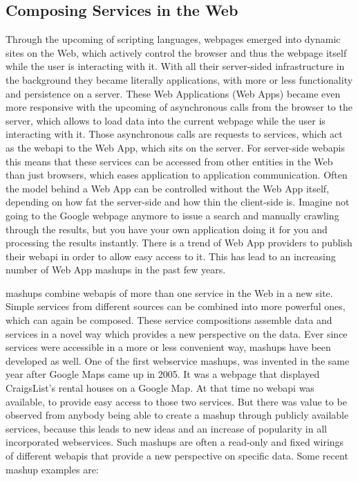 \subsection{Composing Services in the Web}
Through the upcoming of scripting languages, webpages emerged into dynamic sites on the Web, which actively control the browser and thus the webpage itself while the user is interacting with it.
With all their server-sided infrastructure in the background they became literally applications, with more or less functionality and persistence on a server.
These \textrm{Web Applications (Web Apps)} became even more responsive with the upcoming of asynchronous calls from the browser to the server, which allows to load data into the current webpage while the user is interacting with it.
Those asynchronous calls are requests to services, which act as the \textrm{\gls{webapi}} to the \textrm{Web App}, which sits on the server.
For server-side \textrm{\gls{webapi}s} this means that these services can be accessed from other entities in the Web than just browsers, which eases application to application communication.
Often the model behind a \textrm{Web App} can be controlled without the \textrm{Web App} itself, depending on how fat the server-side and how thin the client-side is.
Imagine not going to the Google webpage anymore to issue a search and manually crawling through the results, but you have your own application doing it for you and processing the results instantly.
There is a trend of \textrm{Web App} providers to publish their \textrm{\gls{webapi}} in order to allow easy access to it.
This has lead to an increasing number of \textrm{Web App \glspl{mashup}} in the past few years.

\textrm{\glspl{mashup}} combine \textrm{\glspl{webapi}} of more than one service in the Web in a new site.
Simple services from different sources can be combined into more powerful ones, which can again be composed.
These service compositions assemble data and services in a novel way which provides a new perspective on the data.
Ever since services were accessible in a more or less convenient way, \textrm{\glspl{mashup}} have been developed as well.
One of the first \textrm{\gls{webservice} \glspl{mashup}}\cite{wwwHosuingMaps}, was invented in the same year after Google Maps came up in 2005.
It was a webpage that displayed CraigsList's rental houses on a Google Map.
At that time no \textrm{\gls{webapi}} was available, to provide easy access to those two services.
But there was value to be observed from anybody being able to create a \textrm{\gls{mashup}} through publicly available services, because this leads to new ideas and an increase of popularity in all incorporated \textrm{\glspl{webservice}}.
Such \textrm{\glspl{mashup}} are often a read-only and fixed wirings of different \textrm{\glspl{webapi}} that provide a new perspective on specific data.
Some recent \textrm{\gls{mashup}} examples are:

